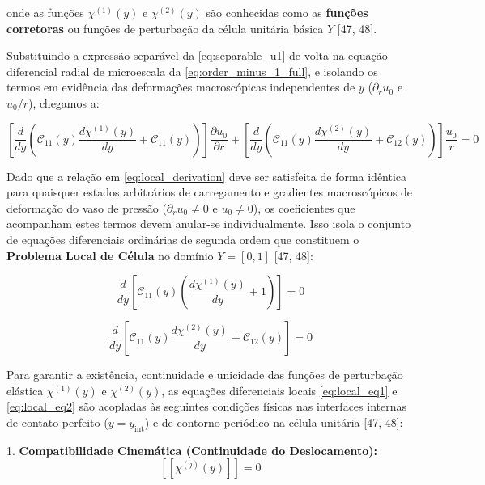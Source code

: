 onde as funções $\chi^{(1)}(y)$ e $\chi^{(2)}(y)$ são conhecidas como as \textbf{funções corretoras} ou funções de perturbação da célula unitária básica $Y$ [47, 48].

Substituindo a expressão separável da \eqref{eq:separable_u1} de volta na equação diferencial radial de microescala da \eqref{eq:order_minus_1_full}, e isolando os termos em evidência das deformações macroscópicas independentes de $y$ ($\partial_r u_0$ e $u_0/r$), chegamos a:

\begin{equation}
  \left[ \frac{d}{d y} \left( \mathcal{C}_{11}(y) \frac{d \chi^{(1)}(y)}{d y} + \mathcal{C}_{11}(y) \right) \right] \frac{\partial u_0}{\partial r} + \left[ \frac{d}{d y} \left( \mathcal{C}_{11}(y) \frac{d \chi^{(2)}(y)}{d y} + \mathcal{C}_{12}(y) \right) \right] \frac{u_0}{r} = 0
  \label{eq:local_derivation}
\end{equation}

Dado que a relação em \eqref{eq:local_derivation} deve ser satisfeita de forma idêntica para quaisquer estados arbitrários de carregamento e gradientes macroscópicos de deformação do vaso de pressão ($\partial_r u_0 \neq 0$ e $u_0 \neq 0$), os coeficientes que acompanham estes termos devem anular-se individualmente. Isso isola o conjunto de equações diferenciais ordinárias de segunda ordem que constituem o \textbf{Problema Local de Célula} no domínio $Y = [0, 1]$ [47, 48]:

\begin{equation}
  \frac{d}{d y} \left[ \mathcal{C}_{11}(y) \left( \frac{d \chi^{(1)}(y)}{d y} + 1 \right) \right] = 0
  \label{eq:local_eq1}
\end{equation}

\begin{equation}
  \frac{d}{d y} \left[ \mathcal{C}_{11}(y) \frac{d \chi^{(2)}(y)}{d y} + \mathcal{C}_{12}(y) \right] = 0
  \label{eq:local_eq2}
\end{equation}

Para garantir a existência, continuidade e unicidade das funções de perturbação elástica $\chi^{(1)}(y)$ e $\chi^{(2)}(y)$, as equações diferenciais locais \eqref{eq:local_eq1} e \eqref{eq:local_eq2} são acopladas às seguintes condições físicas nas interfaces internas de contato perfeito ($y = y_{\text{int}}$) e de contorno periódico na célula unitária [47, 48]:

1. \textbf{Compatibilidade Cinemática (Continuidade do Deslocamento):}
\begin{equation}
  \left[\left[ \chi^{(j)}(y) \right]\right] = 0
  \label{eq:local_cont_disp}
\end{equation}

